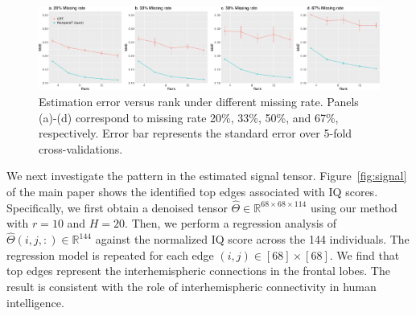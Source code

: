 \documentclass[11pt]{article}
\theoremstyle{plain}
\theoremstyle{definition}
\begin{document}
\begin{figure}[h!]
\includegraphics[width = \textwidth]{figure/brain_sim.pdf}
\caption{Estimation error versus rank under different missing rate. Panels (a)-(d) correspond to missing rate 20\%, 33\%, 50\%, and 67\%, respectively. Error bar represents the standard error over 5-fold cross-validations.}\label{fig:braincv}
\end{figure}

We next investigate the pattern in the estimated signal tensor. Figure~\ref{fig:signal} of the main paper shows the identified top edges associated with IQ scores. Specifically, we first obtain a denoised tensor $\hat \Theta\in\mathbb{R}^{68\times 68\times 114}$ using our method with $r=10$ and $H=20$. Then, we perform a regression analysis of $\hat \Theta(i,j,\colon)\in\mathbb{R}^{144}$ against the normalized IQ score across the 144 individuals. The regression model is repeated for each edge $(i,j)\in[68]\times[68]$. We find that top edges represent the interhemispheric connections in the frontal lobes. The result is consistent with the role of interhemispheric connectivity in human intelligence. 
\end{document}
